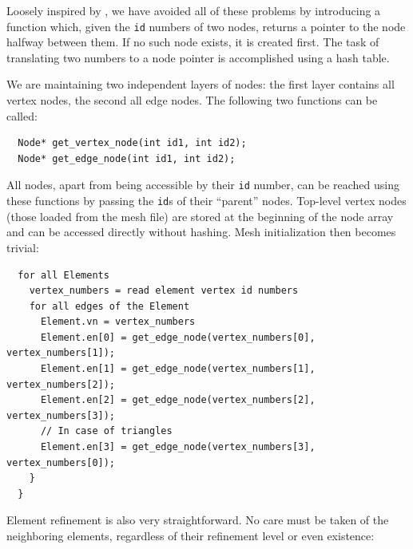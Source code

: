 Loosely inspired by \cite{skala}, we have avoided all of these problems
by introducing a function which, given the {\tt id} numbers of two nodes,
returns a pointer to the node halfway between them. If no such node
exists, it is created first. The task of translating two numbers to
a node pointer is accomplished using a hash table.

We are maintaining two independent layers of nodes: the first layer
contains all vertex nodes, the second all edge nodes. The following
two functions can be called:

\begin{lstlisting}
  Node* get_vertex_node(int id1, int id2);
  Node* get_edge_node(int id1, int id2);
\end{lstlisting}

All nodes, apart from being accessible by their {\tt id} number, can be reached using these functions by
passing the {\tt id}s of their ``parent'' nodes. Top-level vertex nodes (those loaded from the mesh file)
are stored at the beginning of the node array and can be accessed directly without hashing. Mesh
initialization then becomes trivial:

\begin{lstlisting}
  for all Elements
    vertex_numbers = read element vertex id numbers
    for all edges of the Element
      Element.vn = vertex_numbers
      Element.en[0] = get_edge_node(vertex_numbers[0], vertex_numbers[1]);
      Element.en[1] = get_edge_node(vertex_numbers[1], vertex_numbers[2]);
      Element.en[2] = get_edge_node(vertex_numbers[2], vertex_numbers[3]);
      // In case of triangles
      Element.en[3] = get_edge_node(vertex_numbers[3], vertex_numbers[0]);
    }
  }
\end{lstlisting}

Element refinement is also very straightforward. No care must be taken of the neighboring
elements, regardless of their refinement level or even existence:

